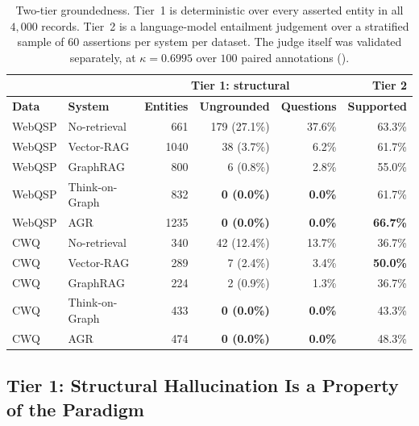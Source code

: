 \begin{table}[!tb]
  \begin{center}
    \caption[Two-tier groundedness]{Two-tier groundedness. Tier~1 is
    deterministic over every asserted entity in all $4{,}000$ records. Tier~2 is
    a language-model entailment judgement over a stratified sample of $60$
    assertions per system per dataset. The judge itself was validated
    separately, at $\kappa = 0.6995$ over $100$ paired annotations
    ().}
    \label{tab:groundedness}
    \small
    \begin{tabular}{|l|l|r|r|r|r|}
      \hline
      & & \multicolumn{3}{c|}{\textbf{Tier 1: structural}} &
      \textbf{Tier 2} \\
      \hline
      \textbf{Data} & \textbf{System} & \textbf{Entities} &
      \textbf{Ungrounded} & \textbf{Questions} & \textbf{Supported} \\
      \hline
      WebQSP & No-retrieval   & 661  & 179 (27.1\%) & 37.6\% & 63.3\% \\
      WebQSP & Vector-RAG     & 1040 & 38 (3.7\%)   & 6.2\%  & 61.7\% \\
      WebQSP & GraphRAG       & 800  & 6 (0.8\%)    & 2.8\%  & 55.0\% \\
      WebQSP & Think-on-Graph & 832  & \textbf{0 (0.0\%)} & \textbf{0.0\%} &
        61.7\% \\
      WebQSP & AGR            & 1235 & \textbf{0 (0.0\%)} & \textbf{0.0\%} &
        \textbf{66.7\%} \\
      \hline
      CWQ & No-retrieval   & 340 & 42 (12.4\%) & 13.7\% & 36.7\% \\
      CWQ & Vector-RAG     & 289 & 7 (2.4\%)   & 3.4\%  & \textbf{50.0\%} \\
      CWQ & GraphRAG       & 224 & 2 (0.9\%)   & 1.3\%  & 36.7\% \\
      CWQ & Think-on-Graph & 433 & \textbf{0 (0.0\%)} & \textbf{0.0\%} &
        43.3\% \\
      CWQ & AGR            & 474 & \textbf{0 (0.0\%)} & \textbf{0.0\%} &
        48.3\% \\
      \hline
    \end{tabular}
  \end{center}
\end{table}

\subsection{Tier 1: Structural Hallucination Is a Property of the Paradigm}

